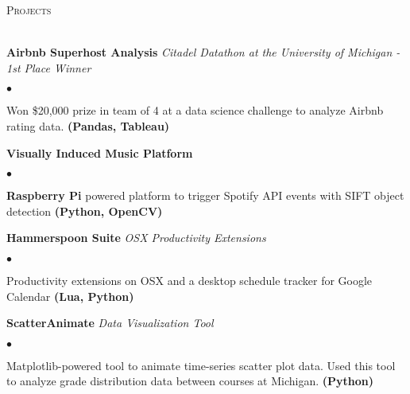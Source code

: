 \documentclass[10pt]{article}
\newcommand{\lineunder}{\vspace*{-8pt} \\ \hspace*{-18pt} \hrulefill \\}
\newcommand{\header}[1]{{\hspace*{-15pt}\vspace*{6pt} \Large\textsc{#1}} \vspace*{-6pt} \lineunder \vspace{4pt}}
\newenvironment{achievements}{\begin{list}{$\bullet$}{\topsep 0pt \itemsep -2pt}}{\vspace*{6pt}\end{list}}
\begin{document}

\vspace{8pt}

\header{Projects}

\vspace{4pt}

\normalsize\textbf{Airbnb Superhost Analysis }{\textit{Citadel Datathon at the University of Michigan - 1st Place Winner}}
\small
\begin{achievements}
	\item Won \$20,000 prize in team of 4 at a data science challenge to analyze Airbnb rating data. \textbf{(Pandas, Tableau)}
\end{achievements}

\normalsize\textbf{Visually Induced Music Platform }{}
\small
\begin{achievements}
	\item \textbf{Raspberry Pi} powered platform to trigger Spotify API events with SIFT object detection \textbf{(Python, OpenCV)}
\end{achievements}

\normalsize\textbf{Hammerspoon Suite }{\textit{OSX Productivity Extensions}}
\small
\begin{achievements}
	\item Productivity extensions on OSX and a desktop schedule tracker for Google Calendar \textbf{(Lua, Python)}
\end{achievements}

\normalsize\textbf{ScatterAnimate }{\textit{Data Visualization Tool}}
\small
\begin{achievements}
	\item Matplotlib-powered tool to animate time-series scatter plot data. Used this tool to analyze grade distribution data between courses at Michigan. \textbf{(Python)}
\end{achievements}
\end{document}
